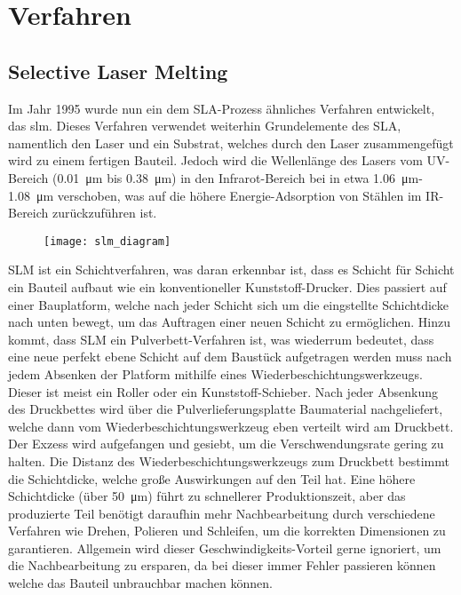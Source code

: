 \documentclass[../main.tex]{subfiles}
\begin{document}
\section{Verfahren}
\subsection{Selective Laser Melting}
Im Jahr 1995 wurde nun ein dem SLA-Prozess ähnliches Verfahren entwickelt, das \acrfull{slm}. Dieses Verfahren verwendet weiterhin Grundelemente des SLA, namentlich den Laser und ein Substrat, welches durch den Laser zusammengefügt wird zu einem fertigen Bauteil. 
Jedoch wird die Wellenlänge des Lasers vom UV-Bereich (\qty{0.01}{\micro\meter} bis \qty{0.38}{\micro\meter}) in den Infrarot-Bereich bei in etwa \qty{1.06}{\micro\meter}-\qty{1.08}{\micro\meter} verschoben, was auf die höhere Energie-Adsorption von Stählen im IR-Bereich zurückzuführen ist.\parencite{3FAKTUR_1}
\begin{figure}[h]
\begin{center}
	\texttt{[image: slm\_diagram]}
	\label{img:slm_diagram}
\end{center}
\end{figure}	
SLM ist ein Schichtverfahren, was daran erkennbar ist, dass es Schicht für Schicht ein Bauteil aufbaut wie ein konventioneller Kunststoff-Drucker. Dies passiert auf einer Bauplatform, welche nach jeder Schicht sich um die eingstellte Schichtdicke nach unten bewegt, um das Auftragen einer neuen Schicht zu ermöglichen. 
Hinzu kommt, dass SLM ein Pulverbett-Verfahren ist, was wiederrum bedeutet, dass eine neue perfekt ebene Schicht auf dem Baustück aufgetragen werden muss nach jedem Absenken der Platform mithilfe eines Wiederbeschichtungswerkzeugs.
Dieser ist meist ein Roller oder ein Kunststoff-Schieber. Nach jeder Absenkung des Druckbettes wird über die Pulverlieferungsplatte Baumaterial nachgeliefert, welche dann vom Wiederbeschichtungswerkzeug eben verteilt wird am Druckbett. Der Exzess wird aufgefangen und gesiebt, um die Verschwendungsrate gering zu halten.  
Die Distanz des Wiederbeschichtungswerkzeugs zum Druckbett bestimmt die Schichtdicke, welche große Auswirkungen auf den Teil hat. Eine höhere Schichtdicke (über \qty{50}{\micro\meter}) führt zu schnellerer Produktionszeit, aber das produzierte Teil benötigt daraufhin mehr Nachbearbeitung durch verschiedene Verfahren wie Drehen, Polieren und Schleifen, um die korrekten Dimensionen zu garantieren. Allgemein wird dieser Geschwindigkeits-Vorteil gerne ignoriert, um die Nachbearbeitung zu ersparen, da bei dieser immer Fehler passieren können welche das Bauteil unbrauchbar machen können.
\end{document}
